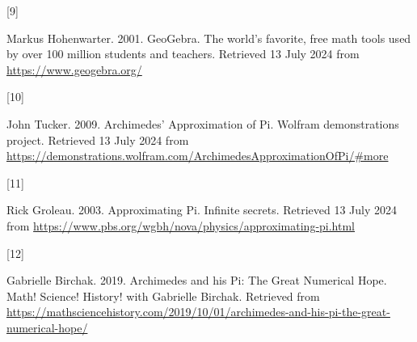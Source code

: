 \documentclass[
  a4paper,
]{article}
\newlength{\cslhangindent}
\newlength{\csllabelwidth}
\newenvironment{CSLReferences}[2] %
 {\begin{list}{}{%
  \setlength{\itemindent}{0pt}
  \setlength{\leftmargin}{0pt}
  \setlength{\parsep}{0pt}
  \ifodd #1
   \setlength{\leftmargin}{\cslhangindent}
   \setlength{\itemindent}{-1\cslhangindent}
  \fi
  \setlength{\itemsep}{#2\baselineskip}}}
 {\end{list}}
\newcommand{\CSLLeftMargin}[1]{\parbox[t]{\csllabelwidth}{\strut#1\strut}}
\newcommand{\CSLRightInline}[1]{\parbox[t]{\linewidth - \csllabelwidth}{\strut#1\strut}}
\begin{document}
\begin{CSLReferences}{0}{0}
\CSLLeftMargin{{[}9{]} }%
\CSLRightInline{Markus Hohenwarter. 2001. {GeoGebra}. {The world's
favorite, free math tools used by over 100 million students and
teachers}. Retrieved 13 July 2024 from \url{https://www.geogebra.org/}}

\CSLLeftMargin{{[}10{]} }%
\CSLRightInline{John Tucker. 2009. {Archimedes' Approximation of Pi}.
Wolfram demonstrations project. Retrieved 13 July 2024 from
\url{https://demonstrations.wolfram.com/ArchimedesApproximationOfPi/\#more}}

\CSLLeftMargin{{[}11{]} }%
\CSLRightInline{Rick Groleau. 2003. {Approximating Pi}. Infinite
secrets. Retrieved 13 July 2024 from
\url{https://www.pbs.org/wgbh/nova/physics/approximating-pi.html}}

\CSLLeftMargin{{[}12{]} }%
\CSLRightInline{Gabrielle Bir­chak. 2019. {Archimedes and his Pi: The
Great Numerical Hope}. {Math! Science! History! with Gabrielle Birchak}.
Retrieved from
\url{https://mathsciencehistory.com/2019/10/01/archimedes-and-his-pi-the-great-numerical-hope/}}

\end{CSLReferences}
\end{document}

